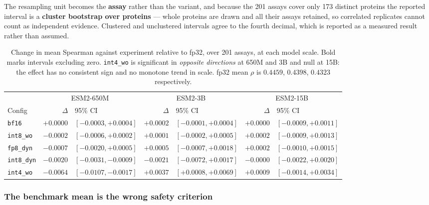 \documentclass[11pt]{article}
\newcommand{\cfg}[1]{\texttt{#1}}
\begin{document}
The resampling unit becomes the \textbf{assay} rather than the variant, and
because the 201 assays cover only 173 distinct proteins the reported interval is
a \textbf{cluster bootstrap over proteins} --- whole proteins are drawn and all
their assays retained, so correlated replicates cannot count as independent
evidence. Clustered and unclustered intervals agree to the fourth decimal, which
is reported as a measured result rather than assumed.

\begin{table}[htb]
\centering
\caption{Change in mean Spearman against experiment relative to fp32, over 201
assays, at each model scale. Bold marks intervals excluding zero.
\cfg{int4\_wo} is significant in \emph{opposite directions} at 650M and 3B and
null at 15B: the effect has no consistent sign and no monotone trend in scale.
fp32 mean $\rho$ is $0.4459$, $0.4398$, $0.4323$ respectively.}
\label{tab:acc3}
\small
\setlength{\tabcolsep}{4pt}
\begin{tabular}{lrlrlrl}
\toprule
& \multicolumn{2}{c}{ESM2-650M} & \multicolumn{2}{c}{ESM2-3B} & \multicolumn{2}{c}{ESM2-15B} \\
\cmidrule(lr){2-3}\cmidrule(lr){4-5}\cmidrule(lr){6-7}
Config & $\Delta$ & 95\% CI & $\Delta$ & 95\% CI & $\Delta$ & 95\% CI \\
\midrule
\cfg{bf16}      & $+0.0000$ & $[-0.0003,+0.0004]$ & $+0.0002$ & $[-0.0001,+0.0004]$ & $+0.0000$ & $[-0.0009,+0.0011]$ \\
\cfg{int8\_wo}  & $-0.0002$ & $[-0.0006,+0.0002]$ & $+0.0001$ & $[-0.0002,+0.0005]$ & $+0.0002$ & $[-0.0009,+0.0013]$ \\
\cfg{fp8\_dyn}  & $-0.0007$ & $[-0.0020,+0.0005]$ & $+0.0005$ & $[-0.0007,+0.0018]$ & $+0.0002$ & $[-0.0010,+0.0015]$ \\
\cfg{int8\_dyn} & $\mathbf{-0.0020}$ & $[-0.0031,-0.0009]$ & $-0.0021$ & $[-0.0072,+0.0017]$ & $-0.0000$ & $[-0.0022,+0.0020]$ \\
\cfg{int4\_wo}  & $\mathbf{-0.0064}$ & $[-0.0107,-0.0017]$ & $\mathbf{+0.0037}$ & $[+0.0008,+0.0069]$ & $+0.0009$ & $[-0.0014,+0.0034]$ \\
\bottomrule
\end{tabular}
\end{table}

\subsubsection{The benchmark mean is the wrong safety criterion}
\end{document}
